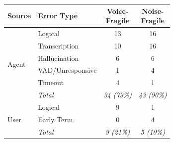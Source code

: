 \begin{tabular}{@{}llcc@{}}
\toprule
\textbf{Source} & \textbf{Error Type} & \makecell{\textbf{Voice-}\\\textbf{Fragile}} & \makecell{\textbf{Noise-}\\\textbf{Fragile}} \\
\midrule
\multirow{6}{*}{Agent} & Logical & 13 & 16 \\
& Transcription & 10 & 16 \\
& Hallucination & 6 & 6 \\
& VAD/Unresponsive & 1 & 4 \\
& Timeout & 4 & 1 \\
\cmidrule{2-4}
& \textit{Total} & \textit{34 (79\%)} & \textit{43 (90\%)} \\
\midrule
\multirow{3}{*}{User} & Logical & 9 & 1 \\
& Early Term. & 0 & 4 \\
\cmidrule{2-4}
& \textit{Total} & \textit{9 (21\%)} & \textit{5 (10\%)} \\
\bottomrule
\end{tabular}